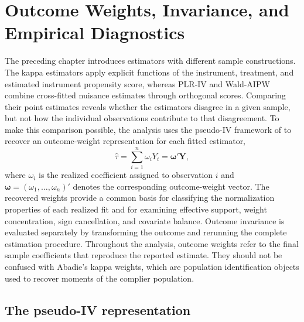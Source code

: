 \documentclass[12pt, a4paper, oneside]{article}
\theoremstyle{plain}
\theoremstyle{definition}
\begin{document}
\section{Outcome Weights, Invariance, and Empirical Diagnostics}
\label{sec:connecting_frameworks}
The preceding chapter introduces estimators with different sample
constructions. The kappa estimators apply explicit functions of the instrument,
treatment, and estimated instrument propensity score, whereas PLR-IV and
Wald-AIPW combine cross-fitted nuisance estimates through orthogonal scores.
Comparing their point estimates reveals whether the estimators disagree in a
given sample, but not how the individual observations contribute to that
disagreement. To make this comparison possible, the analysis uses the pseudo-IV framework of
\citet{knaus2024treatment} to recover an outcome-weight representation for each
fitted estimator,
\begin{equation}
    \widehat{\tau}
    =
    \sum_{i=1}^{n}\omega_iY_i
    =
    \boldsymbol{\omega}'\boldsymbol{Y},
    \label{eq:outcome_weight_representation}
\end{equation}
where $\omega_i$ is the realized coefficient assigned to observation $i$ and
$\boldsymbol{\omega}=(\omega_1,\ldots,\omega_n)'$ denotes the corresponding
outcome-weight vector.
The recovered weights provide a common basis for classifying the normalization
properties of each realized fit and for examining effective support, weight
concentration, sign cancellation, and covariate balance. Outcome invariance is
evaluated separately by transforming the outcome and rerunning the complete
estimation procedure. 
Throughout the analysis, outcome weights refer to the final sample coefficients
that reproduce the reported estimate. They should not be confused with
Abadie's kappa weights, which are population identification objects used to
recover moments of the complier population.







\subsection{The pseudo-IV representation}
\label{subsec:knaus_framework}
\end{document}
